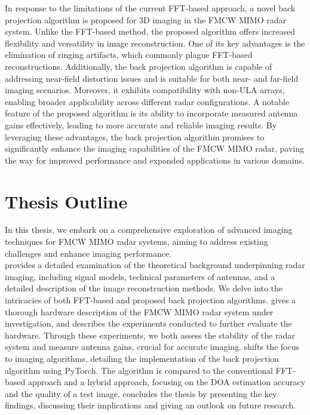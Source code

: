 In response to the limitations of the current FFT-based approach,
a novel back projection algorithm is proposed for 3D imaging in the FMCW MIMO radar system.
Unlike the FFT-based method, the proposed algorithm offers increased flexibility and versatility in image reconstruction.
One of its key advantages is the elimination of ringing artifacts, which commonly plague FFT-based reconstructions.
Additionally, the back projection algorithm is capable of addressing near-field distortion issues and is suitable
for both near- and far-field imaging scenarios. Moreover, it exhibits compatibility with non-ULA arrays,
enabling broader applicability across different radar configurations. A notable feature of the proposed algorithm
is its ability to incorporate measured antenna gains effectively, leading to more accurate and reliable imaging results.
By leveraging these advantages, the back projection algorithm promises to significantly enhance the imaging capabilities of the FMCW MIMO radar,
paving the way for improved performance and expanded applications in various domains. \\

\section{Thesis Outline}
In this thesis, we embark on a comprehensive exploration of advanced imaging techniques for FMCW MIMO radar systems,
aiming to address existing challenges and enhance imaging performance.\\

 provides a detailed examination of
the theoretical background underpinning radar imaging,
including signal models, technical parameters of antennas, and a detailed description of the image reconstruction methods.
We delve into the intricacies of both FFT-based and proposed back projection algorithms.
 gives a thorough hardware description of the FMCW MIMO radar system under investigation,
and describes the experiments conducted to further evaluate the hardware.
Through these experiments, we both assess the stability of the radar system and measure antenna gains,
crucial for accurate imaging.
 shifts the focus to imaging algorithms,
detailing the implementation of the back projection algorithm using PyTorch.
The algorithm is compared to the conventional FFT-based approach and a hybrid approach,
focusing on the DOA estimation accuracy and the quality of a test image.
 concludes the thesis by presenting the key findings, discussing their implications
and giving an outlook on future research.

